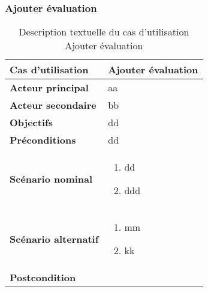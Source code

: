         \subsubsection[Ajouter évaluation]{Ajouter évaluation}
        \begin{longtable}{p{4cm} p{9cm}}
            \caption{Description textuelle du cas d’utilisation Ajouter évaluation}
            \label{table:usecaseAjouterEval}
            \\\hline\hline
                \textbf{Cas d’utilisation} & \textbf{Ajouter évaluation}
            \\\hline\hline
                    \textbf{Acteur principal} & aa
                \\
                    \textbf{Acteur secondaire} & bb
                \\
                    \textbf{Objectifs} & dd
                \\
                    \textbf{Préconditions} & dd
                \\
                \textbf{Scénario nominal} &
                    \begin{enumerate}[leftmargin=*]
                        \item dd
                        \item ddd
                    \end{enumerate}
                \\
                \textbf{Scénario alternatif} &
                    \begin{enumerate}[leftmargin=*]
                        \item mm
                        \item kk
                    \end{enumerate}
                \\
                \textbf{Postcondition}
            \\\bottomrule
        \end{longtable}

